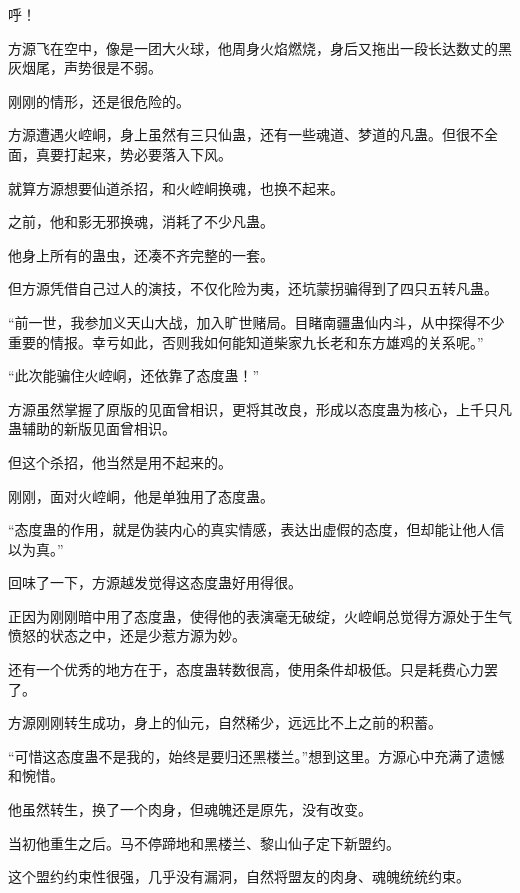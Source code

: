
\begin{this_body}



呼！

方源飞在空中，像是一团大火球，他周身火焰燃烧，身后又拖出一段长达数丈的黑灰烟尾，声势很是不弱。

刚刚的情形，还是很危险的。

方源遭遇火崆峒，身上虽然有三只仙蛊，还有一些魂道、梦道的凡蛊。但很不全面，真要打起来，势必要落入下风。

就算方源想要仙道杀招，和火崆峒换魂，也换不起来。

之前，他和影无邪换魂，消耗了不少凡蛊。

他身上所有的蛊虫，还凑不齐完整的一套。

但方源凭借自己过人的演技，不仅化险为夷，还坑蒙拐骗得到了四只五转凡蛊。

“前一世，我参加义天山大战，加入旷世赌局。目睹南疆蛊仙内斗，从中探得不少重要的情报。幸亏如此，否则我如何能知道柴家九长老和东方雄鸡的关系呢。”

“此次能骗住火崆峒，还依靠了态度蛊！”

方源虽然掌握了原版的见面曾相识，更将其改良，形成以态度蛊为核心，上千只凡蛊辅助的新版见面曾相识。

但这个杀招，他当然是用不起来的。

刚刚，面对火崆峒，他是单独用了态度蛊。

“态度蛊的作用，就是伪装内心的真实情感，表达出虚假的态度，但却能让他人信以为真。”

回味了一下，方源越发觉得这态度蛊好用得很。

正因为刚刚暗中用了态度蛊，使得他的表演毫无破绽，火崆峒总觉得方源处于生气愤怒的状态之中，还是少惹方源为妙。

还有一个优秀的地方在于，态度蛊转数很高，使用条件却极低。只是耗费心力罢了。

方源刚刚转生成功，身上的仙元，自然稀少，远远比不上之前的积蓄。

“可惜这态度蛊不是我的，始终是要归还黑楼兰。”想到这里。方源心中充满了遗憾和惋惜。

他虽然转生，换了一个肉身，但魂魄还是原先，没有改变。

当初他重生之后。马不停蹄地和黑楼兰、黎山仙子定下新盟约。

这个盟约约束性很强，几乎没有漏洞，自然将盟友的肉身、魂魄统统约束。


\end{this_body}
